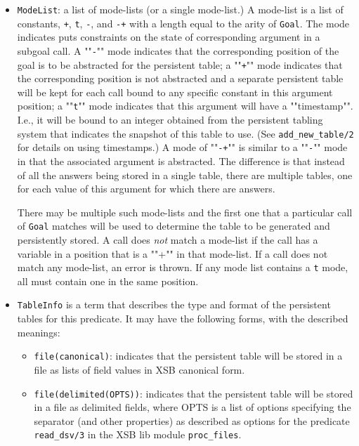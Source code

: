 \begin{description}
\begin{itemize}
\item{{\tt ModeList}}: a list of mode-lists (or a single mode-list.)
A mode-list is a list of constants, {\tt +}, {\tt t}, {\tt -}, and
{\tt -+} with a length equal to the arity of {\tt Goal}.  The mode
indicates puts constraints on the state of corresponding argument in a
subgoal call.  A ""{\tt -}"" mode indicates that the corresponding
position of the goal is to be abstracted for the persistent table; a
""{\tt +}"" mode indicates that the corresponding position is not
abstracted and a separate persistent table will be kept for each call
bound to any specific constant in this argument position; a ""{\tt t}""
mode indicates that this argument will have a ""timestamp"".  I.e., it
will be bound to an integer obtained from the persistent tabling system
that indicates the snapshot of this table to use.  (See
{\tt add\_new\_table/2} for details on using timestamps.)  A mode of
""{\tt -+}"" is similar to a ""{\tt -}"" mode in that the associated
argument is abstracted.  The difference is that instead of all the
answers being stored in a single table, there are multiple tables, one
for each value of this argument for which there are answers.

There may be multiple such mode-lists and the first one that a
particular call of {\tt Goal} matches will be used to determine the
table to be generated and persistently stored.  A call does {\em not}
match a mode-list if the call has a variable in a position that is a
""+"" in that mode-list.  If a call does not match any mode-list, an
error is thrown.  If any mode list contains a {\tt t} mode, all must
contain one in the same position.

\item{{\tt TableInfo}} is a term that describes the type and format of the
persistent tables for this predicate.  It may have the following forms,
with the described meanings:

\begin{itemize}

\item{{\tt file(canonical)}}: indicates that the persistent table will be
stored in a file as lists of field values in XSB canonical form.

\item{{\tt file(delimited(OPTS))}}: indicates that the persistent table
will be stored in a file as delimited fields, where OPTS is a list of
options specifying the separator (and other properties) as described
as options for the predicate {\tt read\_dsv/3} in the XSB lib module
{\tt proc\_files}.


\end{itemize}
\end{itemize}
\end{description}
